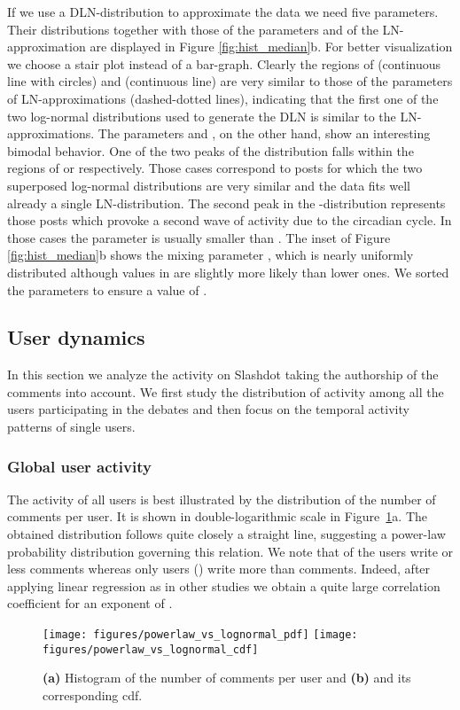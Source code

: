\documentclass[twoside,11pt]{article}
\begin{document}
If we use a DLN-distribution to approximate the data we need five
parameters. Their distributions together with those of the parameters
 and  of the LN-approximation are displayed in Figure
\ref{fig:hist_median}b. For better visualization we choose a stair
plot instead of a bar-graph. Clearly the regions of 
(continuous line with circles) and  (continuous line) are
very similar to those of the parameters of LN-approximations
(dashed-dotted lines), indicating that the first one of the two
log-normal distributions used to generate the DLN is similar to the
LN-approximations.  The parameters  and , on the
other hand, show an interesting bimodal behavior.  One of the two
peaks of the distribution falls within the regions of  or
 respectively. Those cases correspond to posts for which the
two superposed log-normal distributions are very similar and the data
fits well already a single LN-distribution.  The second peak in the
-distribution represents those posts which provoke a second
wave of activity due to the circadian cycle.  In those cases the
parameter  is usually smaller than .  The inset of
Figure \ref{fig:hist_median}b shows the mixing parameter , which is
nearly uniformly distributed although values in  are slightly
more likely than lower ones.  We sorted the parameters to ensure a
value of .

\subsection{User dynamics}\noindent
In this section we analyze the activity on Slashdot taking the
authorship of the comments into account. We first study the
distribution of activity among all the users participating in the
debates and then focus on the temporal activity patterns of single
users.

\subsubsection{Global user activity} \noindent 
The activity of all users is best illustrated by the distribution of
the number of comments per user. It is shown in double-logarithmic
scale in Figure~\ref{fig:powerlaw}a.  The obtained distribution
follows quite closely a straight line, suggesting a power-law
probability distribution governing this relation.  We note that 
of the users write  or less comments whereas only  users
() write more than  comments.  Indeed, after applying
linear regression as in other studies
\citep{faloutsos1999, barabasi1999} we obtain a quite large correlation
coefficient  for an exponent of .
\begin{figure}[!t]\centering
  \texttt{[image: figures/powerlaw\_vs\_lognormal\_pdf]}
  \texttt{[image: figures/powerlaw\_vs\_lognormal\_cdf]}
  \caption{\textbf{(a)} Histogram of the number of comments per user
    and \textbf{(b)} and its corresponding cdf.}
\label{fig:powerlaw}
\end{figure}
\end{document}
